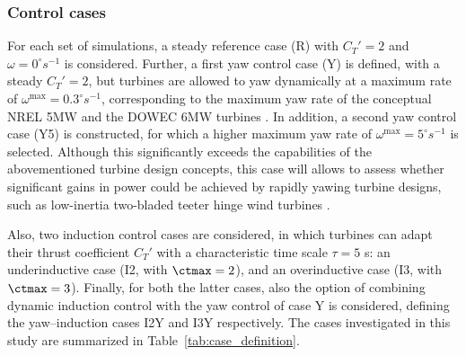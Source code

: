 \subsubsection{Control cases}

For each set of simulations, a steady reference case (R) with $C_T' = 2$ and $\omega = 0^\circ s^{-1}$ is considered. Further, a first yaw control case (Y) is defined, with a steady $C_T'=2$, but turbines are allowed to yaw dynamically at a maximum rate of $\omega^{\text{max}} = 0.3^\circ s^{-1}$, corresponding to the maximum yaw rate of the conceptual NREL 5MW and the DOWEC 6MW turbines \citep{jonkman2009definition, kooijman2003dowec}. In addition, a second yaw control case (Y5) is constructed, for which a higher maximum yaw rate of $\omega^{\text{max}} = 5^\circ s^{-1}$ is selected. Although this significantly exceeds the capabilities of the abovementioned turbine design concepts, this case will allows to assess whether significant gains in power could be achieved by rapidly yawing turbine designs, such as low-inertia two-bladed teeter hinge wind turbines \citep{kim2014yaw}. 

Also, two induction control cases are considered, in which turbines can adapt their thrust coefficient $C_T'$ with a characteristic time scale $\tau = 5$ s: an underinductive case (I2, with $\ctmax = 2$), and an overinductive case (I3, with $\ctmax = 3$). Finally, for both the latter cases, also the option of combining dynamic induction control with the yaw control of case Y is considered, defining the yaw--induction cases I2Y and I3Y respectively. The cases investigated in this study are summarized in Table~\ref{tab:case_definition}. 

